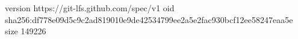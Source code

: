 version https://git-lfs.github.com/spec/v1
oid sha256:df778e09d5c9c2ad819010e9de42534799ee2a5e2fac930bcf12ee58247eaa5e
size 149226
